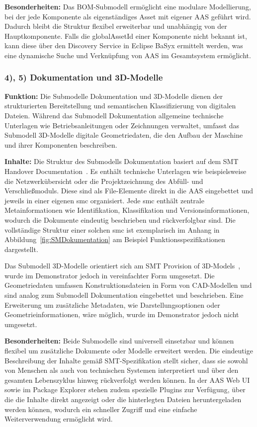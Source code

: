 \textbf{Besonderheiten:}  
Das BOM-Submodell ermöglicht eine modulare Modellierung, bei der jede Komponente als eigenständiges Asset mit eigener AAS geführt wird.  
Dadurch bleibt die Struktur flexibel erweiterbar und unabhängig von der Hauptkomponente.  
Falls die globalAssetId einer Komponente nicht bekannt ist, kann diese über den Discovery Service in Eclipse BaSyx ermittelt werden, was eine dynamische Suche und Verknüpfung von AAS im Gesamtsystem ermöglicht.

\subsubsection*{4), 5) Dokumentation und 3D-Modelle}
\vspace{-0.5em}
\textbf{Funktion:}  
Die Submodelle Dokumentation und 3D-Modelle dienen der strukturierten Bereitstellung und semantischen Klassifizierung von digitalen Dateien.  
Während das Submodell Dokumentation allgemeine technische Unterlagen wie Betriebsanleitungen oder Zeichnungen verwaltet, umfasst das Submodell 3D-Modelle digitale Geometriedaten, die den Aufbau der Maschine und ihrer Komponenten beschreiben. 

\textbf{Inhalte:}  
Die Struktur des Submodells Dokumentation basiert auf dem SMT Handover Documentation~\cite{SpezifikationDokumentation}.  
Es enthält technische Unterlagen wie beispielsweise die Netzwerkübersicht oder die Projektzeichnung des Abfüll- und Verschließmoduls.  
Diese sind als File-Elemente direkt in die AAS eingebettet und jeweils in einer eigenen \acs{smc} organisiert.  
Jede smc enthält zentrale Metainformationen wie Identifikation, Klassifikation und Versionsinformationen, wodurch die Dokumente eindeutig beschrieben und rückverfolgbar sind.  
Die vollständige Struktur einer solchen \acs{smc} ist exemplarisch im Anhang in Abbildung~\ref{fig:SMDokumentation} am Beispiel Funktionsspezifikationen dargestellt.

Das Submodell 3D-Modelle orientiert sich am SMT Provision of 3D-Models~\cite{Spezifikation3DModelle}, wurde im Demonstrator jedoch in vereinfachter Form umgesetzt.  
Die Geometriedaten umfassen Konstruktionsdateien in Form von CAD-Modellen und sind analog zum Submodell Dokumentation eingebettet und beschrieben.  
Eine Erweiterung um zusätzliche Metadaten, wie Darstellungsoptionen oder Geometrieinformationen, wäre möglich, wurde im Demonstrator jedoch nicht umgesetzt.  

\textbf{Besonderheiten:}  
Beide Submodelle sind universell einsetzbar und können flexibel um zusätzliche Dokumente oder Modelle erweitert werden.  
Die eindeutige Beschreibung der Inhalte gemäß SMT-Spezifikation stellt sicher, dass sie sowohl von Menschen als auch von technischen Systemen interpretiert und über den gesamten Lebenszyklus hinweg rückverfolgt werden können.  
In der AAS Web UI sowie im Package Explorer stehen zudem spezielle Plugins zur Verfügung, über die die Inhalte direkt angezeigt oder die hinterlegten Dateien heruntergeladen werden können, wodurch ein schneller Zugriff und eine einfache Weiterverwendung ermöglicht wird.

